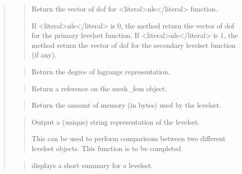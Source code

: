 \documentclass[a4paper,11pt,english]{sphinxmanual}
\begin{document}
\sphinxAtStartPar
{}
\begin{quote}

\sphinxAtStartPar
{}
\begin{quote}

\sphinxAtStartPar
Return the vector of dof for \textless{}literal\textgreater{}nls\textless{}/literal\textgreater{} function.

\sphinxAtStartPar
If \textless{}literal\textgreater{}nls\textless{}/literal\textgreater{} is 0, the method return the vector of dof for the primary
level\sphinxhyphen{}set function. If \textless{}literal\textgreater{}nls\textless{}/literal\textgreater{} is 1, the method return the vector of
dof for the secondary level\sphinxhyphen{}set function (if any).
\end{quote}

\sphinxAtStartPar
{}
\begin{quote}

\sphinxAtStartPar
Return the degree of lagrange representation.
\end{quote}

\sphinxAtStartPar
{}
\begin{quote}

\sphinxAtStartPar
Return a reference on the mesh\_fem object.
\end{quote}

\sphinxAtStartPar
{}
\begin{quote}

\sphinxAtStartPar
Return the amount of memory (in bytes) used by the level\sphinxhyphen{}set.
\end{quote}

\sphinxAtStartPar
{}
\begin{quote}

\sphinxAtStartPar
Output a (unique) string representation of the levelset.

\sphinxAtStartPar
This can be used to perform comparisons between two
different levelset objects.
This function is to be completed.
\end{quote}

\sphinxAtStartPar
{}
\begin{quote}

\sphinxAtStartPar
displays a short summary for a levelset.
\end{quote}
\end{quote}
\end{document}
